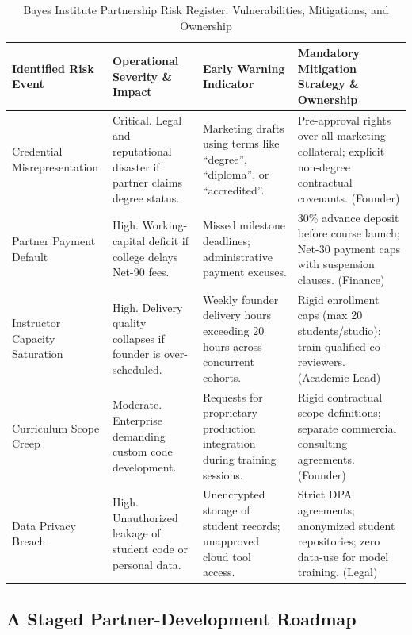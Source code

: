 \begin{table}[t]
\centering
\small
\caption{Bayes Institute Partnership Risk Register: Vulnerabilities, Mitigations, and Ownership}
\label{tab:bayes_partnership_risk_register}
\begin{tabularx}{\textwidth}{p{3.2cm} p{3.4cm} p{3.2cm} X}
\toprule
\textbf{Identified Risk Event} & \textbf{Operational Severity \& Impact} & \textbf{Early Warning Indicator} & \textbf{Mandatory Mitigation Strategy \& Ownership} \\
\midrule
Credential Misrepresentation & Critical. Legal and reputational disaster if partner claims degree status. & Marketing drafts using terms like ``degree'', ``diploma'', or ``accredited''. & Pre-approval rights over all marketing collateral; explicit non-degree contractual covenants. (Founder) \\
Partner Payment Default & High. Working-capital deficit if college delays Net-90 fees. & Missed milestone deadlines; administrative payment excuses. & 30\% advance deposit before course launch; Net-30 payment caps with suspension clauses. (Finance) \\
Instructor Capacity Saturation & High. Delivery quality collapses if founder is over-scheduled. & Weekly founder delivery hours exceeding 20 hours across concurrent cohorts. & Rigid enrollment caps (max 20 students/studio); train qualified co-reviewers. (Academic Lead) \\
Curriculum Scope Creep & Moderate. Enterprise demanding custom code development. & Requests for proprietary production integration during training sessions. & Rigid contractual scope definitions; separate commercial consulting agreements. (Founder) \\
Data Privacy Breach & High. Unauthorized leakage of student code or personal data. & Unencrypted storage of student records; unapproved cloud tool access. & Strict DPA agreements; anonymized student repositories; zero data-use for model training. (Legal) \\
\bottomrule
\end{tabularx}
\end{table}

\subsection{A Staged Partner-Development Roadmap}
\label{sec:staged_partner_roadmap}

